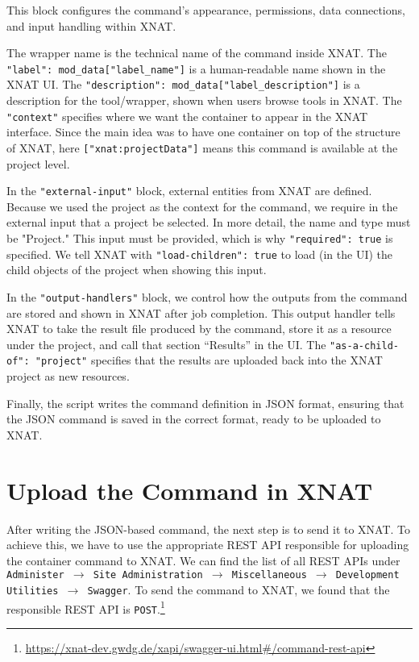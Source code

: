 This block configures the command's appearance, permissions, data connections, and input handling within XNAT.

The wrapper name is the technical name of the command inside XNAT. The \texttt{"label": mod\_data["label\_name"]} is a human-readable name shown in the XNAT \ac{UI}. The \texttt{"description": mod\_data["label\_description"]} is a description for the tool/wrapper, shown when users browse tools in XNAT. The \texttt{"context"} specifies where we want the container to appear in the XNAT interface. Since the main idea was to have one container on top of the structure of XNAT, here \texttt{["xnat:projectData"]} means this command is available at the project level.


In the \texttt{"external-input"} block, external entities from XNAT are defined. Because we used the project as the context for the command, we require in the external input that a project be selected. In more detail, the name and type must be "Project." This input must be provided, which is why \texttt{"required": true} is specified. We tell XNAT with \texttt{"load-children": true} to load (in the UI) the child objects of the project when showing this input.

In the \texttt{"output-handlers"} block, we control how the outputs from the command are stored and shown in XNAT after job completion. This output handler tells XNAT to take the result file produced by the command, store it as a resource under the project, and call that section ``Results'' in the UI. The \texttt{"as-a-child-of": "project"} specifies that the results are uploaded back into the XNAT project as new resources.

Finally, the script writes the command definition in JSON format, ensuring that the JSON command is saved in the correct format, ready to be uploaded to XNAT.

\section{Upload the Command in XNAT}

After writing the JSON-based command, the next step is to send it to XNAT. To achieve this, we have to use the appropriate REST API responsible for uploading the container command to XNAT.
We can find the list of all REST APIs under \texttt{Administer $\rightarrow$ Site Administration $\rightarrow$ Miscellaneous $\rightarrow$ Development Utilities $\rightarrow$ Swagger}.
To send the command to XNAT, we found that the responsible REST API is \texttt{POST}.\footnote{\url{https://xnat-dev.gwdg.de/xapi/swagger-ui.html\#/command-rest-api}}

